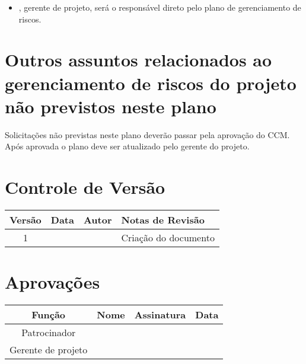 \begin{itemize}
	\item \projectManagerName{}, gerente de projeto, será o responsável direto pelo plano de gerenciamento de riscos.
\end{itemize}

\section{Outros assuntos relacionados ao gerenciamento de riscos do projeto não previstos neste plano}

Solicitações não previstas neste plano deverão passar pela aprovação do CCM. Após aprovada o plano deve ser atualizado pelo gerente do projeto.

\section{Controle de Versão}

\begin{table}[H]
	\begin{tabularx}{\textwidth}{| c | c | X | X |}
		\hline
		\textbf{Versão} & \textbf{Data} & \textbf{Autor}      & \textbf{Notas de Revisão} \\
		\hline
		1                &               & \projectManagerName{} & Criação do documento     \\
		\hline
	\end{tabularx}
	\centering
\end{table}

\section{Aprovações}

\begin{table}[H]
	\begin{tabularx}{\textwidth}{| c | c | X | c |}
		\hline
		\textbf{Função}  & \textbf{Nome}       & \textbf{Assinatura}      & \textbf{Data} \\
		\hline
		Patrocinador       & \projectSponsorName{} & \projectSponsorSignature{} &               \\
		\hline
		Gerente de projeto & \projectManagerName{} & \projectManagerSignature{} &               \\
		\hline
	\end{tabularx}
	\centering
\end{table}